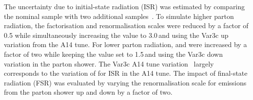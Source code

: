 The uncertainty due to initial-state radiation (ISR) was estimated by
comparing the nominal \ttbar sample with two additional
samples~\cite{ATL-PHYS-PUB-2017-007}.  To simulate higher parton
radiation, the factorisation and renormalisation scales were reduced by
a factor of 0.5 while simultaneously increasing the \hdamp value to
3.0\,\mtop and using the Var3c up variation from the A14 tune. For
lower parton radiation, \muR and \muF were increased by a factor of two
while keeping the \hdamp value set to 1.5\,\mtop and using the Var3c down
variation in the parton shower.  The Var3c A14 tune
variation~\cite{ATL-PHYS-PUB-2014-021} largely corresponds to the variation of
\alphas for ISR in the A14 tune.
The impact of final-state radiation (FSR) was evaluated by
varying the renormalisation scale for emissions from the
parton shower up and down by a factor of two.
